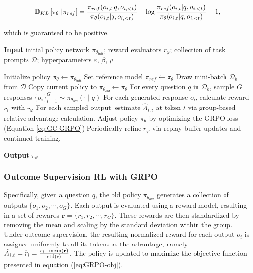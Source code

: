 \begin{itemize}[topsep=0pt]
\begin{itemize}[topsep=0pt]
\begin{equation}
\small
    \mathbb{D}_{KL}\left[\pi_{\theta} || \pi_{ref}\right] = \frac{\pi_{ref}(o_{i,t}|q,o_{i,<t})}{\pi_{\theta}(o_{i,t}|q,o_{i,<t})}- \log\frac{\pi_{ref}(o_{i,t}|q,o_{i,<t})}{\pi_{\theta}(o_{i,t}|q,o_{i,<t})} - 1,
\end{equation}

which is guaranteed to be positive.

\begin{algorithm}[t]
  \small
  \caption{Iterative Group Relative Policy Optimization}
  \textbf{Input} initial policy network $\pi_{\theta_{\text{init}}}$; reward evaluators $r_\varphi$; collection of task prompts $\mathcal{D}$;
  hyperparameters $\varepsilon$, $\beta$, $\mu$
  \begin{algorithmic}[1]
    \State Initialize policy $\pi_\theta \leftarrow \pi_{\theta_{\text{init}}}$
       \State Set reference model $\pi_{ref} \leftarrow \pi_{\theta}$
      \State Draw mini-batch $\mathcal{D}_b$ from $\mathcal{D}$
      \State Copy current policy to $\pi_{\theta_{old}} \leftarrow \pi_{\theta}$
      \State For every question $q$ in $\mathcal{D}_b$, sample $G$ responses $\{o_i\}_{i=1}^G \sim \pi_{\theta_{old}} (\cdot \mid q) $
      \State For each generated response $o_i$, calculate reward $r_i$ with $r_\varphi$
      \State For each sampled output, estimate $\hat{A}_{i,t}$ at token $t$ via group-based relative advantage calculation.
        \State Adjust policy $\pi_\theta$ by optimizing the GRPO loss (Equation \ref{eq:GC-GRPO})
      \EndFor
    \EndFor
    \State Periodically refine $r_\varphi$ via replay buffer updates and continued training.
    \EndFor
  \end{algorithmic}
  \textbf{Output} $\pi_\theta$
  \label{alg:iter-grpo}
\end{algorithm}

\subsubsection{Outcome Supervision RL with GRPO} Specifically, given a question $q$, the old policy $\pi_{\theta_{old}}$ generates a collection of outputs $\{o_1, o_2, \cdots, o_G\}$. Each output is evaluated using a reward model, resulting in a set of rewards $\mathbf{r} = \{r_1, r_2, \cdots, r_G\}$. These rewards are then standardized by removing the mean and scaling by the standard deviation within the group. Under outcome supervision, the resulting normalized reward for each output $o_i$ is assigned uniformly to all its tokens as the advantage, namely $\hat{A}_{i, t} = \widetilde{r}_i = \frac{r_i- {\rm mean}(\mathbf{r})}{{\rm std}(\mathbf{r})}$. The policy is updated to maximize the objective function presented in equation (\ref{eq:GRPO-obj}).


\end{itemize}
\end{itemize}
